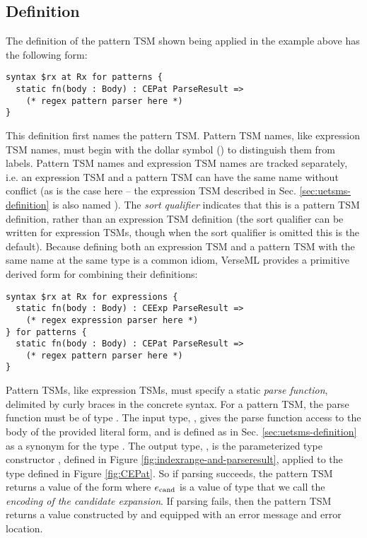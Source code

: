 {\subsection{Definition}\label{sec:ptsms-definition}
The definition of the pattern TSM  shown being applied in the example above has the following form:
\begin{lstlisting}[numbers=none]
syntax $rx at Rx for patterns {
  static fn(body : Body) : CEPat ParseResult =>
    (* regex pattern parser here *)
}
\end{lstlisting}
This definition first names the pattern TSM. Pattern TSM names, like expression TSM names, must begin with the dollar symbol (\li{#\dolla#}) to distinguish them from labels. Pattern TSM names and expression TSM names are tracked separately, i.e. an expression TSM and a pattern TSM can have the same name without conflict (as is the case here -- the expression TSM described in Sec. \ref{sec:uetsms-definition} is also named ). The \emph{sort qualifier}  indicates that this is a pattern TSM definition, rather than an expression TSM definition (the sort qualifier  can be written for expression TSMs, though when the sort qualifier is omitted this is the default). Because defining both an expression TSM and a pattern TSM with the same name at the same type is a common idiom, VerseML provides a primitive derived form for combining their definitions:
\begin{lstlisting}[numbers=none]
syntax $rx at Rx for expressions {
  static fn(body : Body) : CEExp ParseResult => 
    (* regex expression parser here *)
} for patterns {
  static fn(body : Body) : CEPat ParseResult => 
    (* regex pattern parser here *)
}
\end{lstlisting}

Pattern TSMs, like expression TSMs, must specify a static \emph{parse function}, delimited by curly braces in the concrete syntax. For a pattern TSM, the parse function must be of type . The input type, , gives the parse function access to the body of the provided literal form, and is defined as in Sec. \ref{sec:uetsms-definition} as a synonym for the type . The output type, , is the parameterized type constructor , defined in Figure \ref{fig:indexrange-and-parseresult}, applied to the type  defined in Figure \ref{fig:CEPat}.  So if parsing succeeds, the pattern TSM returns a value of the form  where $e_\text{cand}$ is a value of type  that we call the \emph{encoding of the candidate expansion}. If parsing fails, then the pattern TSM returns a value constructed by  and equipped with an error message and error location. 

}

